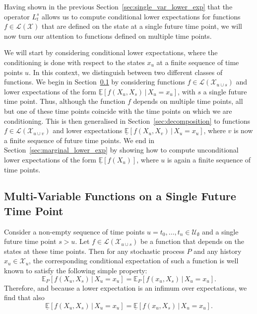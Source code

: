 \documentclass[10pt,a4paper]{paper}
\theoremstyle{definition}
\newcommand{\states}{\mathcal{X}}
\newcommand{\gambles}{\mathcal{L}}
\newcommand{\gamblesX}{\gambles(\states)}
\begin{document}
Having shown in the previous Section~\ref{sec:single_var_lower_exp} that the operator $L_t^s$ allows us to compute conditional lower expectations for functions $f\in\gamblesX$ that are defined on the state at a single future time point, we will now turn our attention to functions defined on multiple time points. 

We will start by considering conditional lower expectations, where the conditioning is done with respect to the states $x_u$ at a finite sequence of time points $u$. In this context, we distinguish between two different classes of functions. 
We begin in Section~\ref{sec:function_single_future_multiple_past} by considering functions $f\in\gambles(\states_{u\cup s})$ and lower expectations of the form $\underline{\mathbb{E}}[f(X_u,X_s)\,\vert\,X_u=x_u]$, with $s$ a single future time point. Thus, although the function $f$ depends on multiple time points, all but one of these time points coincide with the time points on which we are conditioning. This is then generalised in Section~\ref{sec:decomposition} to functions $f\in\gambles(\states_{u\cup v})$ and lower expectations $\underline{\mathbb{E}}[f(X_u,X_v)\,\vert\,X_u=x_u]$, where $v$ is now a finite sequence of future time points. We end in Section~\ref{sec:marginal_lower_exp} by showing how to compute unconditional lower expectations of the form $\underline{\mathbb{E}}[f(X_u)]$, where $u$ is again a finite sequence of time points.

\subsection{Multi-Variable Functions on a Single Future Time Point}\label{sec:function_single_future_multiple_past}

Consider a non-empty sequence of time points $u=t_0,\ldots,t_n\in\mathcal{U}_\emptyset$ and a single future time point $s>u$. Let $f\in\gambles(\states_{u\cup s})$ be a function that depends on the states at these time points. Then for any stochastic process $P$ and any history $x_u\in\states_u$, the corresponding conditional expectation of such a function is well known to satisfy the following simple property:
\vspace{-2pt}
\begin{equation*}
\mathbb{E}_P[f(X_u,X_s)\,\vert\,X_u=x_u] = \mathbb{E}_P[f(x_u,X_s)\,\vert\,X_u=x_u].
\end{equation*}
Therefore, and because a lower expectation is an infimum over expectations, we find that also
\vspace{-2pt}
\begin{equation}\label{eq:fixxu}
\underline{\mathbb{E}}[f(X_u,X_s)\,\vert\,X_u=x_u] = \underline{\mathbb{E}}[f(x_u,X_s)\,\vert\,X_u=x_u].
\end{equation}\\[-18pt]
\end{document}
